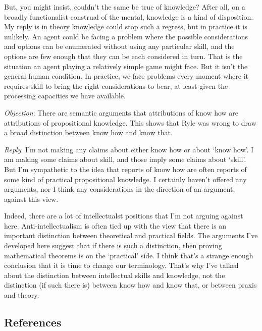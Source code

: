 \documentclass[
  10pt,
  letterpaper,
  DIV=11,
  numbers=noendperiod,
  twoside]{scrartcl}
\begin{document}
But, you might insist, couldn't the same be true of knowledge? After
all, on a broadly functionalist construal of the mental, knowledge is a
kind of disposition. My reply is in theory knowledge could stop such a
regress, but in practice it is unlikely. An agent could be facing a
problem where the possible considerations and options can be enumerated
without using any particular skill, and the options are few enough that
they can be each considered in turn. That is the situation an agent
playing a relatively simple game might face. But it isn't the general
human condition. In practice, we face problems every moment where it
requires skill to bring the right considerations to bear, at least given
the processing capacities we have available.

\emph{Objection}: There are semantic arguments that attributions of know
how are attributions of propositional knowledge. This shows that Ryle
was wrong to draw a broad distinction between know how and know that.

\emph{Reply}: I'm not making any claims about either know how or about
`know how'. I am making some claims about skill, and those imply some
claims about `skill'. But I'm sympathetic to the idea that reports of
know how are often reports of some kind of practical propositional
knowledge. I certainly haven't offered any arguments, nor I think any
considerations in the direction of an argument, against this view.

Indeed, there are a lot of intellectualst positions that I'm not arguing
against here. Anti-intellectualism is often tied up with the view that
there is an important distinction between theoretical and practical
fields. The arguments I've developed here suggest that if there is such
a distinction, then proving mathematical theorems is on the `practical'
side. I think that's a strange enough conclusion that it is time to
change our terminology. That's why I've talked about the distinction
between intellectual skills and knowledge, not the distinction (if such
there is) between know how and know that, or between praxis and theory.

\subsection*{References}\label{references}
\end{document}
